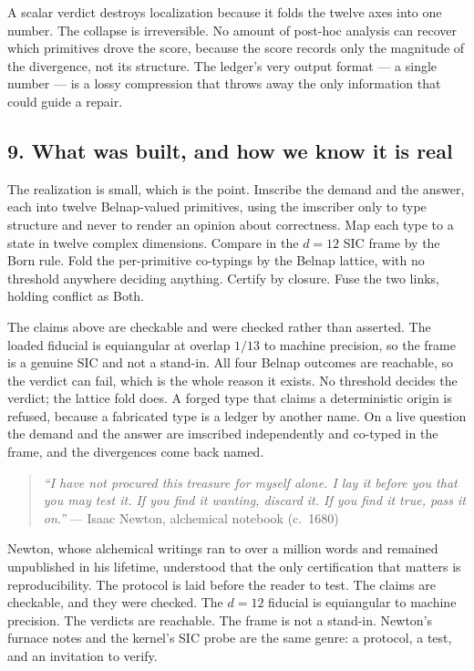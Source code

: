 \documentclass[12pt,a4paper]{article}
\begin{document}
A scalar verdict destroys localization because it folds the twelve axes
into one number. The collapse is irreversible. No amount of post-hoc
analysis can recover which primitives drove the score, because the score
records only the magnitude of the divergence, not its structure. The
ledger's very output format --- a single number --- is a lossy
compression that throws away the only information that could guide a
repair.

\hypertarget{what-was-built-and-how-we-know-it-is-real}{%
\subsection{9. What was built, and how we know it is
real}\label{what-was-built-and-how-we-know-it-is-real}}

The realization is small, which is the point. Imscribe the demand and
the answer, each into twelve Belnap-valued primitives, using the
imscriber only to type structure and never to render an opinion about
correctness. Map each type to a state in twelve complex dimensions.
Compare in the \({d=12}\) SIC frame by the Born rule. Fold the
per-primitive co-typings by the Belnap lattice, with no threshold
anywhere deciding anything. Certify by closure. Fuse the two links,
holding conflict as Both.

The claims above are checkable and were checked rather than asserted.
The loaded fiducial is equiangular at overlap \({1/13}\) to machine
precision, so the frame is a genuine SIC and not a stand-in. All four
Belnap outcomes are reachable, so the verdict can fail, which is the
whole reason it exists. No threshold decides the verdict; the lattice
fold does. A forged type that claims a deterministic origin is refused,
because a fabricated type is a ledger by another name. On a live
question the demand and the answer are imscribed independently and
co-typed in the frame, and the divergences come back named.

\begin{quote}
\emph{``I have not procured this treasure for myself alone. I lay it
before you that you may test it. If you find it wanting, discard it. If
you find it true, pass it on.''} --- Isaac Newton, alchemical notebook
(c.~1680)
\end{quote}

Newton, whose alchemical writings ran to over a million words and
remained unpublished in his lifetime, understood that the only
certification that matters is reproducibility. The protocol is laid
before the reader to test. The claims are checkable, and they were
checked. The \({d=12}\) fiducial is equiangular to machine precision.
The verdicts are reachable. The frame is not a stand-in. Newton's
furnace notes and the kernel's SIC probe are the same genre: a protocol,
a test, and an invitation to verify.
\end{document}
